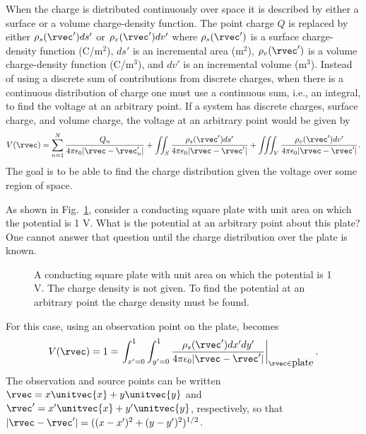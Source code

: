When the charge is distributed continuously over space it is described
by either a surface or a volume charge-density function.  The point
charge $Q$ is replaced by either $\rho_s(\rvec')ds'$ or
$\rho_v(\rvec')dv'$ where $\rho_s(\rvec')$ is a surface charge-density
function (C/m$^2$), $ds'$ is an incremental area (m$^2$),
$\rho_v(\rvec')$ is a volume charge-density function (C/m$^3$), and
$dv'$ is an incremental volume (m$^3$).  Instead of using a discrete
sum of contributions from discrete charges, when there is a continuous
distribution of charge one must use a continuous sum, i.e., an
integral, to find the voltage at an arbitrary point.  If a system has
discrete charges, surface charge, and volume charge, the voltage at an
arbitrary point would be given by
\begin{equation}
  V(\rvec) =
  \sum_{n=1}^{N}\frac{Q_n}{4\pi\epsilon_0|\rvec-\rvec_n'|} +
  \iint_{S}\frac{\rho_s(\rvec')ds'}{4\pi\epsilon_0|\rvec-\rvec'|} +
  \iiint_{V}\frac{\rho_v(\rvec')dv'}{4\pi\epsilon_0|\rvec-\rvec'|}.
  \label{eq:potentialGeneral}
\end{equation}
The goal is to be able to find the charge distribution given the
voltage over some region of space.

As shown in Fig.\ \ref{fig:singlePlate}, consider a conducting square
plate with unit area on which the potential is 1 V.  What is the
potential at an arbitrary point about this plate?  One cannot answer
that question until the charge distribution over the plate is known.
\begin{figure}
  \begin{center}
  \end{center}
  \caption{A conducting square plate with unit area on which the
    potential is 1 V.  The charge density is not given.  To find the
    potential at an arbitrary point the charge density must be found.}
  \label{fig:singlePlate}
\end{figure}
For this case, using an observation point on the plate,
 becomes
\begin{equation}
  V(\rvec) = 1 = 
  \left.
    \int_{x'=0}^1\int_{y'=0}^1
  \frac{\rho_s(\rvec')dx' dy'}{4\pi\epsilon_0|\rvec-\rvec'|}
  \right|_{\rvec\in{\mbox{plate}}}.
  \label{eq:vPlate}
\end{equation}
The observation and source points can be written
$\rvec=x\unitvec{x}+y\unitvec{y}$ and
$\rvec'=x'\unitvec{x}+y'\unitvec{y}$, respectively, so that
$|\rvec-\rvec'|=((x-x')^2+(y-y')^2)^{1/2}$.  

